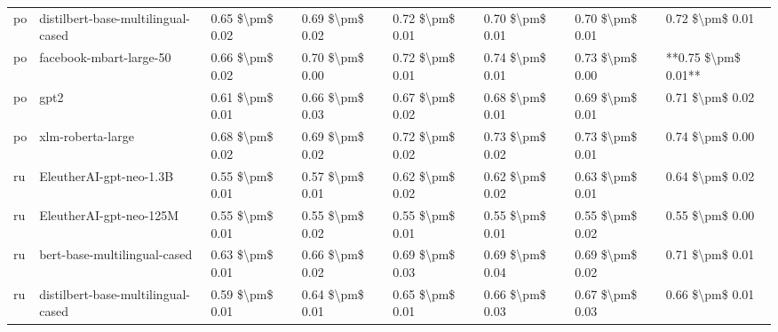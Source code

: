 \begin{tabular}{llllllll}
      po & distilbert-base-multilingual-cased & 0.65 \$\textbackslash pm\$ 0.02 &           0.69 \$\textbackslash pm\$ 0.02 &       0.72 \$\textbackslash pm\$ 0.01 &        0.70 \$\textbackslash pm\$ 0.01 &                         0.70 \$\textbackslash pm\$ 0.01 &     0.72 \$\textbackslash pm\$ 0.01 \\
      po &            facebook-mbart-large-50 & 0.66 \$\textbackslash pm\$ 0.02 &           0.70 \$\textbackslash pm\$ 0.00 &       0.72 \$\textbackslash pm\$ 0.01 &        0.74 \$\textbackslash pm\$ 0.01 &                         0.73 \$\textbackslash pm\$ 0.00 & **0.75 \$\textbackslash pm\$ 0.01** \\
      po &                               gpt2 & 0.61 \$\textbackslash pm\$ 0.01 &           0.66 \$\textbackslash pm\$ 0.03 &       0.67 \$\textbackslash pm\$ 0.02 &        0.68 \$\textbackslash pm\$ 0.01 &                         0.69 \$\textbackslash pm\$ 0.01 &     0.71 \$\textbackslash pm\$ 0.02 \\
      po &                  xlm-roberta-large & 0.68 \$\textbackslash pm\$ 0.02 &           0.69 \$\textbackslash pm\$ 0.02 &       0.72 \$\textbackslash pm\$ 0.02 &        0.73 \$\textbackslash pm\$ 0.02 &                         0.73 \$\textbackslash pm\$ 0.01 &     0.74 \$\textbackslash pm\$ 0.00 \\
      ru &            EleutherAI-gpt-neo-1.3B & 0.55 \$\textbackslash pm\$ 0.01 &           0.57 \$\textbackslash pm\$ 0.01 &       0.62 \$\textbackslash pm\$ 0.02 &        0.62 \$\textbackslash pm\$ 0.02 &                         0.63 \$\textbackslash pm\$ 0.01 &     0.64 \$\textbackslash pm\$ 0.02 \\
      ru &            EleutherAI-gpt-neo-125M & 0.55 \$\textbackslash pm\$ 0.01 &           0.55 \$\textbackslash pm\$ 0.02 &       0.55 \$\textbackslash pm\$ 0.01 &        0.55 \$\textbackslash pm\$ 0.01 &                         0.55 \$\textbackslash pm\$ 0.02 &     0.55 \$\textbackslash pm\$ 0.00 \\
      ru &       bert-base-multilingual-cased & 0.63 \$\textbackslash pm\$ 0.01 &           0.66 \$\textbackslash pm\$ 0.02 &       0.69 \$\textbackslash pm\$ 0.03 &        0.69 \$\textbackslash pm\$ 0.04 &                         0.69 \$\textbackslash pm\$ 0.02 &     0.71 \$\textbackslash pm\$ 0.01 \\
      ru & distilbert-base-multilingual-cased & 0.59 \$\textbackslash pm\$ 0.01 &           0.64 \$\textbackslash pm\$ 0.01 &       0.65 \$\textbackslash pm\$ 0.01 &        0.66 \$\textbackslash pm\$ 0.03 &                         0.67 \$\textbackslash pm\$ 0.03 &     0.66 \$\textbackslash pm\$ 0.01 \\

\end{tabular}
